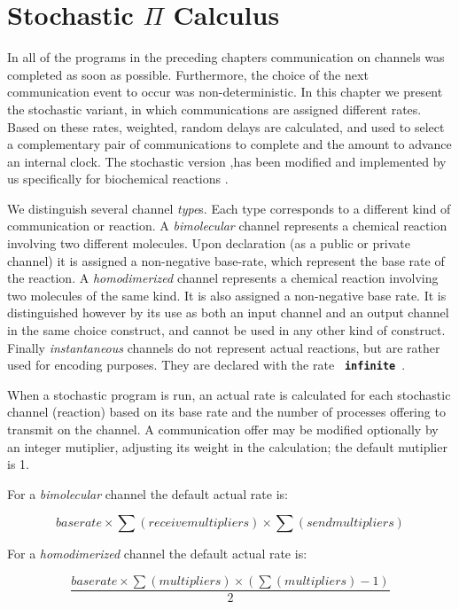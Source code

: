 \documentclass[twoside,10pt]{report}
\begin{document}
\section{Stochastic $\Pi$ Calculus}

In all of the programs in the preceding chapters communication on
channels was completed as soon as possible. Furthermore, the choice of
the next communication event to occur was non-deterministic.  In this
chapter we present the stochastic variant, in which communications are
assigned different rates. Based on these rates, weighted, random
delays are calculated, and used to select a complementary pair of
communications to complete and the amount to advance an internal clock.
The stochastic version \cite{Pri95},has been modified and implemented
by us specifically for biochemical reactions \cite{RPSS}.

We distinguish several channel {\em type}s. Each type corresponds to a
different kind of communication or reaction.  A {\em bimolecular}
channel represents a chemical reaction involving two different
molecules. Upon declaration (as a public or private channel) it is
assigned a non-negative base-rate, which represent the base rate of
the reaction. A {\em homodimerized} channel represents a chemical reaction
involving two molecules of the same kind. It is also assigned a
non-negative base rate. It is distinguished however by its use as both
an input channel and an output channel in the same choice construct,
and cannot be used in any other kind of construct. Finally
{\em instantaneous} channels do not represent actual reactions, but are
rather used for encoding purposes.  They are declared with the rate
{\bf \verb+ infinite +}.

When a stochastic program is run, an actual rate is calculated for
each stochastic channel (reaction) based on its base rate and the
number of processes offering to transmit on the channel.  A
communication offer may be modified optionally by an integer mutiplier,
adjusting its weight in the calculation; the default mutiplier is 1.

\par
\label{default rate}
\noindent
For a {\em bimolecular} channel the default actual rate is:

$$ baserate \times \sum(receive multipliers) \times \sum(send multipliers)  $$

\noindent
For a {\em homodimerized} channel the default actual rate is:

$$ \frac{baserate \times \sum(multipliers) \times(\sum(multipliers) - 1)}{2} $$
\end{document}
